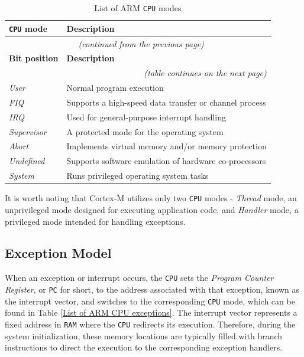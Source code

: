 \documentclass[english, ing, kiv, he, iso690numb, pdf]{fasthesis}
\begin{document}
	\begin{center}
		\begin{longtable}{p{}p{}}
			\caption{List of ARM \texttt{CPU} modes}
			\label{List of ARM CPU modes}\\
			\toprule[1.5pt]
			\textbf{\texttt{CPU} mode} & \textbf{Description}\\
			\midrule
			\endfirsthead
			\multicolumn{2}{c}{\tablename{}~\thetable{} \textit{(continued from the previous page)}}\\
			\midrule
			\textbf{Bit position} & \textbf{Description}\\
			\midrule
			\endhead
			\midrule
			\multicolumn{2}{r}{\textit{(table continues on the next page)}}\\
			\endfoot
			\bottomrule[1.5pt]
			\endlastfoot
			\textit{User} & Normal program execution\\
			\textit{FIQ} & Supports a high-speed data transfer or channel process\\
			\textit{IRQ} & Used for general-purpose interrupt handling\\
			\textit{Supervisor} & A protected mode for the operating system\\
			\textit{Abort} & Implements virtual memory and/or memory protection\\
			\textit{Undefined} & Supports software emulation of hardware co-processors\\
			\textit{System} & Runs privileged operating system tasks\\
		\end{longtable}
	\end{center}
	
	\begin{important}
		It is worth noting that Cortex-M utilizes only two \texttt{CPU} modes - \textit{Thread} mode, an unprivileged mode designed for executing application code, and \textit{Handler} mode, a privileged mode intended for handling exceptions.
	\end{important}
	
	\subsection{Exception Model}
	
	When an exception or interrupt occurs, the \texttt{CPU} sets the \textit{Program Counter Register}, or \texttt{PC} for short, to the address associated with that exception, known as the interrupt vector, and switches to the corresponding \texttt{CPU} mode, which can be found in Table \ref{List of ARM CPU exceptions}. The interrupt vector represents a fixed address in \texttt{RAM} where the \texttt{CPU} redirects its execution. Therefore, during the system initialization, these memory locations are typically filled with branch instructions to direct the execution to the corresponding exception handlers.
	
\end{document}
